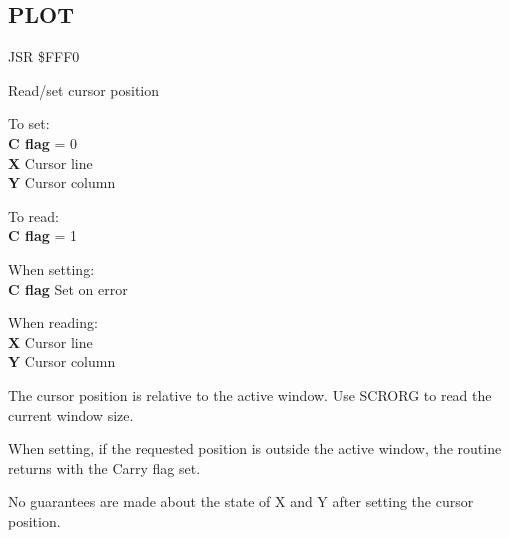 \subsection{PLOT}
\label{KERNAL Jump Table!PLOT}
\begin{description}[leftmargin=2cm,style=nextline]
    \item [Address:] JSR \$FFF0
    \item [Description:] Read/set cursor position
    \item [Inputs:]
        To set: \\
        \textbf{C flag} = 0 \\
        \textbf{X} Cursor line \\
        \textbf{Y} Cursor column

        To read: \\
        \textbf{C flag} = 1
    \item [Outputs:]
        When setting: \\
        \textbf{C flag} Set on error

        When reading: \\
        \textbf{X} Cursor line \\
        \textbf{Y} Cursor column
    \item [Remarks:]
        The cursor position is relative to the active window. Use SCRORG to read the current window size.

        When setting, if the requested position is outside the active window, the routine returns with the Carry flag set.

        No guarantees are made about the state of X and Y after setting the cursor position.
    \item [Example:]
\end{description}



\newpage
